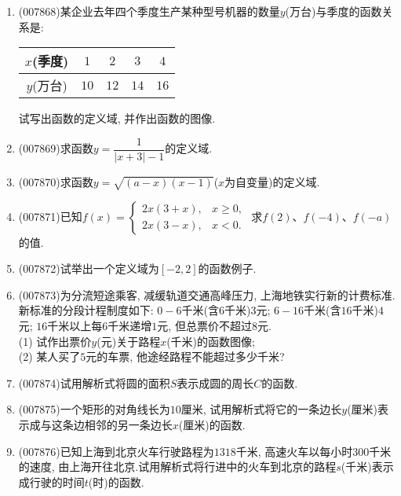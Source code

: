 \documentclass[10pt,a4paper]{article}
\begin{document}
\begin{enumerate}[1.]
\begin{center}
\end{center}
\item {\tiny (007868)}某企业去年四个季度生产某种型号机器的数量$y$(万台)与季度的函数关系是:
\begin{center}
    \begin{tabular}{|c|c|c|c|c|}
        \hline
        $x$(季度) & $1$ & $2$ & $3$ & $4$\\ \hline
        $y$(万台) & $10$ & $12$ & $14$ & $16$\\ \hline
    \end{tabular}
\end{center}
试写出函数的定义域, 并作出函数的图像.
\item {\tiny (007869)}求函数$y=\dfrac 1{|x+3|-1}$的定义域.
\item {\tiny (007870)}求函数$y=\sqrt {(a-x)(x-1)}$($x$为自变量)的定义域.
\item {\tiny (007871)}已知$f(x)=\begin{cases} 2x(3+x), & x\ge 0, \\ 2x(3-x), & x<0. \end{cases}$ 求$f(2)$、$f(-4)$、$f(-a)$的值.
\item {\tiny (007872)}试举出一个定义域为$[-2,2]$的函数例子.
\item {\tiny (007873)}为分流短途乘客, 减缓轨道交通高峰压力, 上海地铁实行新的计费标准. 新标准的分段计程制度如下: $0-6$千米(含$6$千米)$3$元; $6-16$千米(含$16$千米)$4$元; $16$千米以上每$6$千米递增$1$元, 但总票价不超过$8$元.\\
(1) 试作出票价$y$(元)关于路程$x$(千米)的函数图像;\\
(2) 某人买了$5$元的车票, 他途经路程不能超过多少千米?
\item {\tiny (007874)}试用解析式将圆的面积$S$表示成圆的周长$C$的函数.
\item {\tiny (007875)}一个矩形的对角线长为$10$厘米, 试用解析式将它的一条边长$y$(厘米)表示成与这条边相邻的另一条边长$x$(厘米)的函数.
\item {\tiny (007876)}已知上海到北京火车行驶路程为$1318$千米, 高速火车以每小时$300$千米的速度, 由上海开往北京.试用解析式将行进中的火车到北京的路程$s$(千米)表示成行驶的时间$t$(时)的函数.

\end{enumerate}
\end{document}

